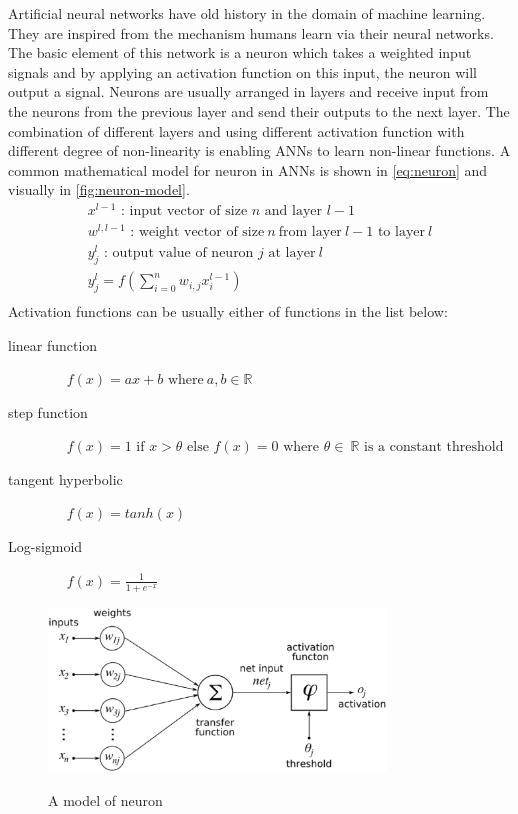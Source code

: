Artificial neural networks have old history in the domain of machine learning.
They are inspired from the mechanism humans learn via their neural networks. The
basic element of this network is a neuron which takes a weighted input signals and by applying an activation function
on this input, the neuron will output a signal. 
 Neurons are usually arranged in
layers and receive input from the neurons from the previous layer and send their
outputs to the next layer. The combination of different layers and using
different activation function with different degree of non-linearity is enabling
ANNs to learn non-linear functions.\cite{Braspenning1995}
A common mathematical model for neuron in ANNs is shown in
\eqref{eq:neuron} and visually in \autoref{fig:neuron-model}.
\begin{equation}
\label{eq:neuron}
\begin{split}
x^{l-1} \mbox{~: input vector of size~}n  \mbox{~and layer~}l-1
\\
w^{l,l-1} \mbox{~: weight vector of size}~n~ \text{from layer}~l-1 \text{~to
layer}~l
\\
y_{j}^{l} \mbox{~: output value of neuron~}j  \mbox{~at layer}~l\\
y_{j}^{l} = f(\sum_{i=0}^{n} w_{i,j}x_{i}^{l-1})\\
\end{split}
\end{equation} 
Activation functions can be
usually either of functions in the list below:
\begin{description}
\item[linear function] ~~ $f(x)=ax+b \mbox{~where}~ a,b \in \mathbb{R}$
\item[step function] ~~ $ f(x)=1 \mbox{~if~} x > \theta \mbox{~else~} f(x)=0
\mbox{~where~}\theta \in \mathbb{~R} \mbox{~is a constant threshold} $
\item[tangent hyperbolic] ~~ $f(x)=tanh(x)$
\item[Log-sigmoid] ~~ $f(x)=\frac{1}{1+e^{-x}}$
\end{description}

    \begin{figure}[h!]
  \caption{A model of neuron}
  \centering
    \includegraphics[width=0.8\textwidth]{neuron-model.eps}
    \label{fig:neuron-model}
\end{figure} 

